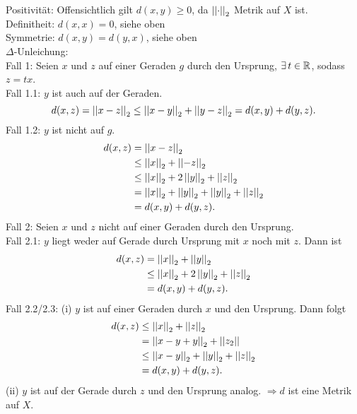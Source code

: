 \documentclass[../ana2u.tex]{subfiles}
\begin{document}
    \begin{bew}
        Positivität: Offensichtlich gilt \( d(x,y) \geq 0 \), 
        da \(\left|\left|\cdot\right|\right|_2\)
        Metrik auf \(X\) ist. \\
        Definitheit: \( d(x,x) = 0 \), siehe oben \\
        Symmetrie: \( d(x,y) = d(y,x) \), siehe oben \\
        \( \Delta \)-Unleichung: \\
        Fall 1:
        Seien \( x \) und \( z \) auf einer Geraden \(g\) 
        durch den Ursprung, \dphp{} \( \exists t \in \R \), 
        sodass \(z=tx\).\\
        Fall 1.1: \( y \) ist auch auf der Geraden.
        \[ d(x,z) = \left|\left|x-z\right|\right|_2 \leq \left|\left|x-y\right|\right|_2 + \left|\left|y-z\right|\right|_2 
        = d(x,y) + d(y,z). \]
        Fall 1.2: \( y \) ist nicht auf \(g\).
        \begin{align*}
            d(x,z) &= \left|\left|x-z\right|\right|_2 \\
            &\leq \left|\left|x\right|\right|_2 + \left|\left|-z\right|\right|_2  \\
            &\leq \left|\left|x\right|\right|_2 + 2\left|\left|y\right|\right|_2 + \left|\left|z\right|\right|_2 \\
            &= \left|\left|x\right|\right|_2 + \left|\left|y\right|\right|_2 + \left|\left|y\right|\right|_2 + \left|\left|z\right|\right|_2 \\
            &= d(x,y) + d(y,z).
        \end{align*}
        Fall 2: Seien \( x \) und \(z\) nicht auf einer Geraden 
        durch den Ursprung.\\
        Fall 2.1: \( y \) liegt weder auf Gerade durch Ursprung 
        mit \(x\) noch mit \(z\). Dann ist 
        \begin{align*}
            d(x,z) &= \left|\left|x\right|\right|_2 + \left|\left|y\right|\right|_2 \\
            &\leq \left|\left|x\right|\right|_2 + 2\left|\left|y\right|\right|_2 + \left|\left|z\right|\right|_2 \\
            &= d(x,y) + d(y,z).
        \end{align*}    
        Fall 2.2/2.3: (i) \(y\) ist auf einer Geraden durch 
        \( x \) und den Ursprung. Dann folgt
        \begin{align*}
            d(x,z) &\leq \left|\left|x\right|\right|_2 + \left|\left|z\right|\right|_2 \\
            &= \left|\left|x - y + y\right|\right|_2 + \left|\left|z_2\right|\right| \\
            &\leq \left|\left|x - y\right|\right|_2 + \left|\left|y\right|\right|_2 + \left|\left|z\right|\right|_2  \\
            &= d(x,y) + d(y,z).
        \end{align*}
        (ii) \(y\) ist auf der Gerade durch \(z\) und den Ursprung 
        analog.
        \( \Rightarrow d \) ist eine Metrik auf \(X\).
    \end{bew}
\end{document}
